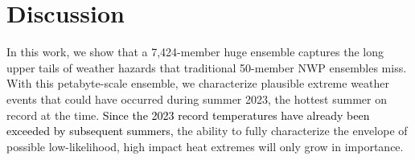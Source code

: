 \documentclass[draft]{agujournal2019}
\renewcommand{\st}[1]{\unskip}
\newcommand{\newTxt}{\textcolor{black}}
\begin{document}

\section{Discussion} \label{sec:Discussion}

In this work, we show that a 7,424-member huge ensemble captures the long upper tails of weather hazards that traditional 50-member NWP ensembles miss. With this petabyte-scale ensemble, we characterize plausible extreme weather events that could have occurred during summer 2023, the hottest summer on record at the time. \st{As summers reaching 2023 levels become increasingly likely due to climate change,} \newTxt{Since the 2023 record temperatures have already been exceeded by subsequent summers,} the ability to fully characterize the envelope of possible low-likelihood, high impact heat extremes will only grow in importance.
\end{document}
